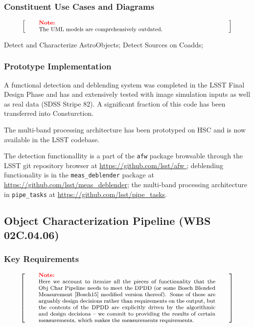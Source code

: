 \documentclass[12pt]{article}
\newcommand{\wbsObjChar}{WBS 02C.04.06}
\newenvironment{note}[1][Note]
{
  \begin{displaymath}
    \left[ \qquad
    \begin{minipage}[h]{.75\linewidth}
      \color{red} \footnotesize
      \textbf{#1:} \newline
      \color{black}
}
{
    \end{minipage}
    \normalsize
    \qquad \right]
  \end{displaymath}
}
\begin{document}
\subsubsection{Constituent Use Cases and Diagrams}

\begin{note}
The UML models are comprehensively outdated.
\end{note}

Detect and Characterize AstroObjects;
Detect Sources on Coadds;

\subsubsection{Prototype Implementation}

A functional detection and deblending system was completed in the LSST Final Design Phase and has and extensively tested with image simulation inputs as well as real data (SDSS Stripe 82). A significant fraction of this code has been transferred into Consturction.

The multi-band processing architecture has been prototyped on HSC and is now available in the LSST codebase.

The detection functionallity is a part of the {\tt afw} package browsable through the LSST git repository browser at \url{https://github.com/lsst/afw }; deblending functionality is in the {\tt meas\_deblender} package at \url{https://github.com/lsst/meas_deblender}; the multi-band processing architecture in \texttt{pipe\_tasks} at \url{https://github.com/lsst/pipe_tasks}.

\clearpage

\subsection{Object Characterization Pipeline (\wbsObjChar)}

\subsubsection{Key Requirements}

\begin{note}
Here we account to itemize all the pieces of functionality that the Obj Char Pipeline needs to meet the DPDD (or some Bosch Blended Measurement \cite{Bosch15} modified version thereof). Some of these are arguably design decisions rather than requirements on the output, but the contents of the DPDD are explicitly driven by the algorithmic and design decisions -- we commit to providing the results of certain measurements, which makes the measurements requirements.
\end{note}
\end{document}
